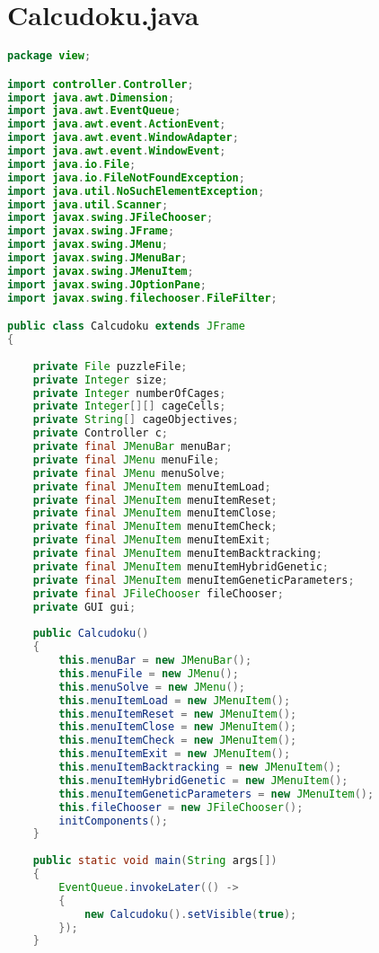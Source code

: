 \section{Calcudoku.java}
\label{sec:kodeprogramcalcudoku}

\begin{lstlisting}[language=Java,basicstyle=\tiny,caption=Calcudoku.java]
package view;

import controller.Controller;
import java.awt.Dimension;
import java.awt.EventQueue;
import java.awt.event.ActionEvent;
import java.awt.event.WindowAdapter;
import java.awt.event.WindowEvent;
import java.io.File;
import java.io.FileNotFoundException;
import java.util.NoSuchElementException;
import java.util.Scanner;
import javax.swing.JFileChooser;
import javax.swing.JFrame;
import javax.swing.JMenu;
import javax.swing.JMenuBar;
import javax.swing.JMenuItem;
import javax.swing.JOptionPane;
import javax.swing.filechooser.FileFilter;

public class Calcudoku extends JFrame
{
    
    private File puzzleFile;
    private Integer size;
    private Integer numberOfCages;
    private Integer[][] cageCells;
    private String[] cageObjectives;
    private Controller c;
    private final JMenuBar menuBar;
    private final JMenu menuFile;
    private final JMenu menuSolve;
    private final JMenuItem menuItemLoad;
    private final JMenuItem menuItemReset;
    private final JMenuItem menuItemClose;
    private final JMenuItem menuItemCheck;
    private final JMenuItem menuItemExit;
    private final JMenuItem menuItemBacktracking;
    private final JMenuItem menuItemHybridGenetic;
    private final JMenuItem menuItemGeneticParameters;
    private final JFileChooser fileChooser;
    private GUI gui;
    
    public Calcudoku()
    {        
        this.menuBar = new JMenuBar();
        this.menuFile = new JMenu();
        this.menuSolve = new JMenu();
        this.menuItemLoad = new JMenuItem();
        this.menuItemReset = new JMenuItem();
        this.menuItemClose = new JMenuItem();
        this.menuItemCheck = new JMenuItem();
        this.menuItemExit = new JMenuItem();
        this.menuItemBacktracking = new JMenuItem();
        this.menuItemHybridGenetic = new JMenuItem();
        this.menuItemGeneticParameters = new JMenuItem();
        this.fileChooser = new JFileChooser();
        initComponents();
    }
    
    public static void main(String args[])
    {
        EventQueue.invokeLater(() ->
        {
            new Calcudoku().setVisible(true);
        });
    }
    

\end{lstlisting}
